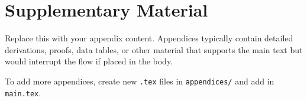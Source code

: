 \documentclass[../main.tex]{subfiles}
\begin{document}
\chapter{Supplementary Material}\label{app:appendix_a}

Replace this with your appendix content. Appendices typically contain detailed derivations, proofs, data tables, or other material that supports the main text but would interrupt the flow if placed in the body.

To add more appendices, create new \texttt{.tex} files in \texttt{appendices/} and add \verb|| in \texttt{main.tex}.
\end{document}
